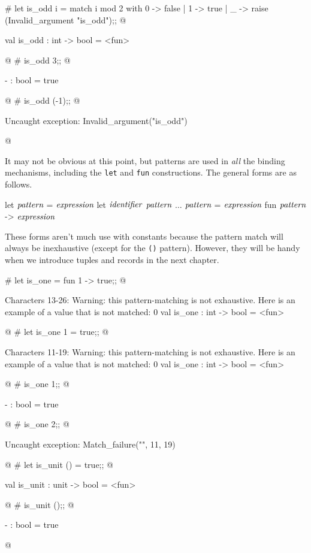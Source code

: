 \begin{ocaml}
# let is_odd i =
     match i mod 2 with
        0 -> false
      | 1 -> true
      | _ -> raise (Invalid_argument "is_odd");;
@
\begin{topoutput}
val is_odd : int -> bool = <fun>
\end{topoutput}
@
# is_odd 3;;
@
\begin{topoutput}
- : bool = true
\end{topoutput}
@
# is_odd (-1);;
@
\begin{toperror}
Uncaught exception: Invalid_argument("is_odd")
\end{toperror}
@
\end{ocaml}


It may not be obvious at this point, but patterns are used in
\emph{all} the binding mechanisms, including the \hbox{\lstinline/let/} and \hbox{\lstinline/fun/}
constructions.  The general forms are as follows.

\begin{ocaml}
let $\textit{\rmfamily pattern}$ = $\textit{\rmfamily expression}$
let $\textit{\rmfamily identifier}$ $\textit{\rmfamily pattern}$ $\ldots$ $\textit{\rmfamily pattern}$ = $\textit{\rmfamily expression}$
fun $\textit{\rmfamily pattern}$ -> $\textit{\rmfamily expression}$
\end{ocaml}
%
These forms aren't much use with constants because the pattern match will
always be inexhaustive (except for the \hbox{\lstinline/()/} pattern).  However,
they will be handy when we introduce tuples and records in the next
chapter.

\begin{ocaml}
# let is_one = fun 1 -> true;;
@
\begin{toperror}
Characters 13-26:
Warning: this pattern-matching is not exhaustive.
Here is an example of a value that is not matched:
0
val is_one : int -> bool = <fun>
\end{toperror}
@
# let is_one 1 = true;;
@
\begin{toperror}
Characters 11-19:
Warning: this pattern-matching is not exhaustive.
Here is an example of a value that is not matched:
0
val is_one : int -> bool = <fun>
\end{toperror}
@
# is_one 1;;
@
\begin{topoutput}
- : bool = true
\end{topoutput}
@
# is_one 2;;
@
\begin{toperror}
Uncaught exception: Match_failure("", 11, 19)
\end{toperror}
@
# let is_unit () = true;;
@
\begin{topoutput}
val is_unit : unit -> bool = <fun>
\end{topoutput}
@
# is_unit ();;
@
\begin{topoutput}
- : bool = true
\end{topoutput}
@
\end{ocaml}
